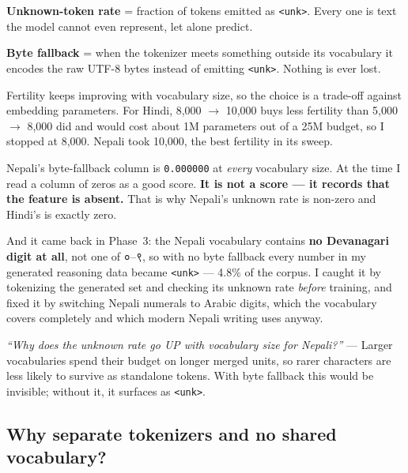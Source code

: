 \documentclass[11pt]{report}
\newcommand{\dn}[1]{{\devanagarifont #1}}
\begin{document}
\textbf{Unknown-token rate} = fraction of tokens emitted as \texttt{<unk>}.
Every one is text the model cannot even represent, let alone predict.

\textbf{Byte fallback} = when the tokenizer meets something outside its
vocabulary it encodes the raw UTF-8 bytes instead of emitting \texttt{<unk>}.
Nothing is ever lost.

\begin{shortans}
Fertility keeps improving with vocabulary size, so the choice is a trade-off
against embedding parameters. For Hindi, 8,000 $\rightarrow$ 10,000 buys less
fertility than 5,000 $\rightarrow$ 8,000 did and would cost about 1M parameters
out of a 25M budget, so I stopped at 8,000. Nepali took 10,000, the best
fertility in its sweep.
\end{shortans}

\begin{trap}
Nepali's byte-fallback column is \texttt{0.000000} at \emph{every} vocabulary
size. At the time I read a column of zeros as a good score. \textbf{It is not a
score --- it records that the feature is absent.} That is why Nepali's unknown
rate is non-zero and Hindi's is exactly zero.

\medskip
And it came back in Phase~3: the Nepali vocabulary contains \textbf{no
Devanagari digit at all}, not one of \dn{०}--\dn{९}, so with no byte fallback
every number in my generated reasoning data became \texttt{<unk>} --- 4.8\% of
the corpus. I caught it by tokenizing the generated set and checking its
unknown rate \emph{before} training, and fixed it by switching Nepali numerals
to Arabic digits, which the vocabulary covers completely and which modern
Nepali writing uses anyway.
\end{trap}

\begin{notebox}
\textit{``Why does the unknown rate go UP with vocabulary size for Nepali?''}
--- Larger vocabularies spend their budget on longer merged units, so rarer
characters are less likely to survive as standalone tokens. With byte fallback
this would be invisible; without it, it surfaces as \texttt{<unk>}.
\end{notebox}

\subsection{Why separate tokenizers and no shared vocabulary?}
\end{document}
